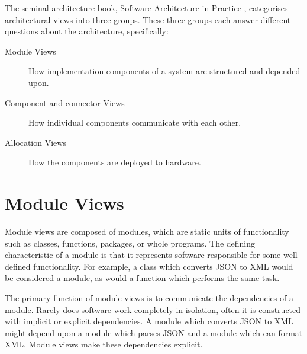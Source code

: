 The seminal architecture book, Software Architecture in Practice \cite{bass2021software},
categorises architectural views into three groups.
These three groups each answer different questions about the architecture, specifically:
\begin{description}
    \item[Module Views] How implementation components of a system are structured and depended upon.
    \item[Component-and-connector Views] How individual components communicate with each other.
    \item[Allocation Views] How the components are deployed to hardware.
\end{description}

\section{Module Views}
Module views are composed of modules, which are static units of functionality such as classes, functions, packages, or whole programs.
The defining characteristic of a module is that it represents software responsible for some well-defined functionality.
For example, a class which converts JSON to XML would be considered a module, as would a function which performs the same task.

The primary function of module views is to communicate the dependencies of a module.
Rarely does software work completely in isolation, often it is constructed with implicit or explicit dependencies.
A module which converts JSON to XML might depend upon a module which parses JSON and a module which can format XML.
Module views make these dependencies explicit.

